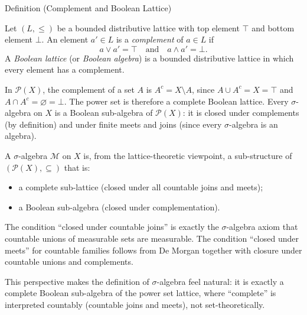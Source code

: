 \begin{definitionbox}{Definition (Complement and Boolean Lattice)}
\begin{definition}\label{def:boolean-lattice}
Let $(L, \leq)$ be a bounded distributive lattice with top element $\top$ and
bottom element $\bot$.  An element $a' \in L$ is a \emph{complement} of
$a \in L$ if
\[
  a \vee a' = \top \quad \text{and} \quad a \wedge a' = \bot.
\]
A \emph{Boolean lattice} (or \emph{Boolean algebra}) is a bounded distributive
lattice in which every element has a complement.
\end{definition}
\end{definitionbox}\begin{remark*}
\label{rem:power-set-boolean}
In $\mathcal{P}(X)$, the complement of a set $A$ is $A^c = X \setminus A$,
since $A \cup A^c = X = \top$ and $A \cap A^c = \varnothing = \bot$.  The
power set is therefore a complete Boolean lattice.  Every $\sigma$-algebra
on $X$ is a Boolean sub-algebra of $\mathcal{P}(X)$: it is closed under
complements (by definition) and under finite meets and joins (since every
$\sigma$-algebra is an algebra).
\end{remark*}


\begin{remark*}
\label{rem:sigma-alg-lattice}
A $\sigma$-algebra $\mathcal{M}$ on $X$ is, from the lattice-theoretic
viewpoint, a sub-structure of $(\mathcal{P}(X), \subseteq)$ that is:
\begin{itemize}
  \item a complete sub-lattice (closed under all countable joins and meets);
  \item a Boolean sub-algebra (closed under complementation).
\end{itemize}
The condition ``closed under countable joins'' is exactly the $\sigma$-algebra
axiom that countable unions of measurable sets are measurable.  The condition
``closed under meets'' for countable families follows from De Morgan together
with closure under countable unions and complements.

This perspective makes the definition of $\sigma$-algebra feel natural: it is
exactly a complete Boolean sub-algebra of the power set lattice, where
``complete'' is interpreted countably (countable joins and meets), not
set-theoretically.
\end{remark*}

